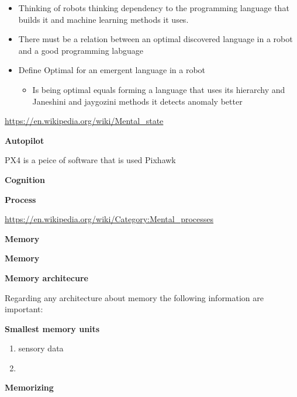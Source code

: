 \documentclass{book}
\providecommand{\ProjectDeepHeading}[2]{%
    \par\medskip\noindent\textbf{#2}\par\smallskip
}
\begin{document}
\begin{itemize}
    \item Thinking of robots thinking dependency to the programming language that builds it and machine learning methods it uses.
    \item There must be a relation between an optimal discovered language in a robot and a good programming labguage
    \item Define Optimal for an emergent language in a robot
        \begin{itemize}
            \item Is being optimal equals forming a language that uses its hierarchy and Janeshini and jaygozini methods it detects anomaly better
        \end{itemize}
\end{itemize}


\url{https://en.wikipedia.org/wiki/Mental_state}

\ProjectDeepHeading{1}{Autopilot}


PX4 is a peice of software that is used Pixhawk

\ProjectDeepHeading{1}{Cognition}

\ProjectDeepHeading{2}{Process}


\url{https://en.wikipedia.org/wiki/Category:Mental_processes}

\ProjectDeepHeading{3}{Memory}


\ProjectDeepHeading{5}{Memory}

\ProjectDeepHeading{6}{Memory architecure}
Regarding any architecture about memory the following information are important:

    \ProjectDeepHeading{7}{Smallest memory units}
        \begin{enumerate}
            \item sensory data
            \item
        \end{enumerate}
    \ProjectDeepHeading{7}{Memorizing}
\end{document}

